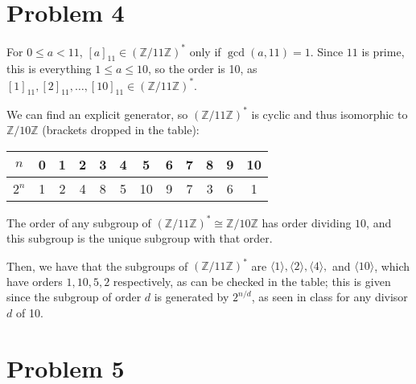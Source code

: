 \documentclass[12pt,letterpaper]{article}
\theoremstyle{definition}
\newcommand{\Z}{\mathbb{Z}}
\begin{document}
\section*{Problem 4}

For $0 \leq a < 11$, $[a]_{11} \in (\Z/11\Z)^{*}$ only if $\gcd(a, 11) = 1$. Since $11$ is prime, this is everything $1 \leq a \leq 10$, so the order is 10, as $[1]_{11}, [2]_{11}, \dots, [10]_{11} \in (\Z/11\Z)^{*}$.

We can find an explicit generator, so $(\Z/11\Z)^{*}$ is cyclic and thus isomorphic to $\Z/10\Z$ (brackets dropped in the table):

\begin{center}
  \begin{tabular}{c|c|c|c|c|c|c|c|c|c|c|c}
    $n$ & 0 & 1 & 2 & 3 & 4 & 5 & 6 & 7 & 8 & 9 & 10 \\ \hline
    $2^{n}$ & 1 & 2 & 4 & 8 & 5 & 10 & 9 & 7 & 3 & 6 & 1 \\
  \end{tabular}
\end{center}

The order of any subgroup of $(\Z/11\Z)^{*} \cong \Z/10\Z$ has order dividing $10$, and this subgroup is the unique subgroup with that order.

Then, we have that the subgroups of $(\Z/11\Z)^{*}$ are $\langle 1 \rangle, \langle 2 \rangle, \langle 4 \rangle,$ and $\langle 10 \rangle$, which have orders $1, 10, 5, 2$ respectively, as can be checked in the table; this is given since the subgroup of order $d$ is generated by $2^{n/d}$, as seen in class for any divisor $d$ of 10.

\section*{Problem 5}
\end{document}
